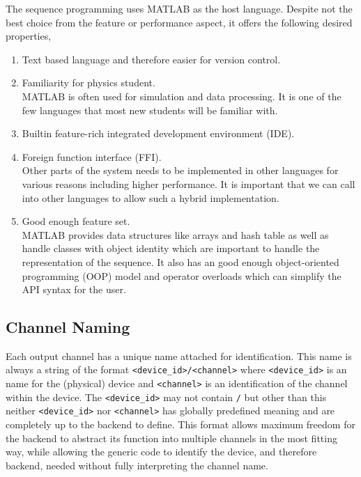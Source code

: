 The sequence programming uses MATLAB as the host language.
Despite not the best choice from the feature or performance aspect,
it offers the following desired properties,
\begin{enumerate}
\item Text based language and therefore easier for version control.
\item Familiarity for physics student.\\
  MATLAB is often used for simulation and data processing.
  It is one of the few languages that most new students will be familiar with.
\item Builtin feature-rich integrated development environment (IDE).
\item Foreign function interface (FFI).\\
  Other parts of the system needs to be implemented in other languages
  for various reasons including higher performance.
  It is important that we can call into other languages to allow such a hybrid implementation.
\item Good enough feature set.\\
  MATLAB provides data structures like arrays and hash table
  as well as handle classes with object identity
  which are important to handle the representation of the sequence.
  It also has an good enough object-oriented programming (OOP) model
  and operator overloads which can simplify the API syntax for the user.
\end{enumerate}

\subsection{Channel Naming}
Each output channel has a unique name attached for identification.
This name is always a string of the format \verb`<device_id>/<channel>`
where \verb`<device_id>` is an name for the (physical) device
and \verb`<channel>` is an identification of the channel within the device.
The \verb`<device_id>` may not contain \verb`/` but other than this
neither \verb`<device_id>` nor \verb`<channel>` has globally predefined meaning
and are completely up to the backend to define.
This format allows maximum freedom for the backend to abstract its function
into multiple channels in the most fitting way,
while allowing the generic code to identify the device, and therefore backend,
needed without fully interpreting the channel name.

